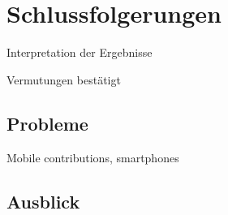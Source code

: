 \chapter{Schlussfolgerungen}\label{ch:conclusion}

\begin{todos}
    \item Interpretation der Ergebnisse
    \item Vermutungen bestätigt
\end{todos}



\section{Probleme}

\begin{todos}
    \item Mobile contributions, smartphones
\end{todos}

\section{Ausblick}
